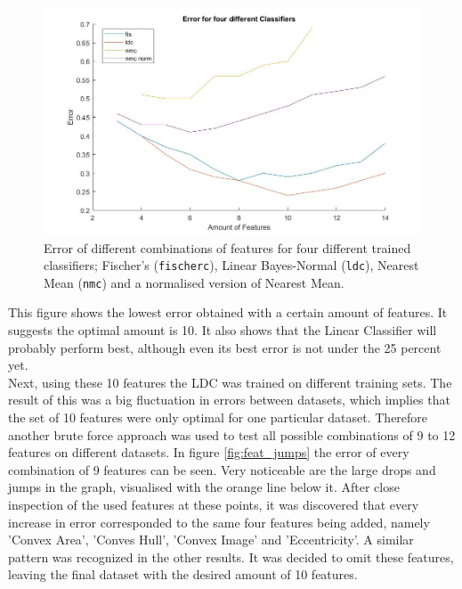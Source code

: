 \begin{figure}[H]
	\centering
	\includegraphics[scale=0.45]{images/feat_bf_error.jpg}
	\caption{Error of different combinations of features for four different trained classifiers; Fischer's (\texttt{fischerc}), Linear Bayes-Normal (\texttt{ldc}), Nearest Mean (\texttt{nmc}) and a normalised version of Nearest Mean.}
	\label{fig:feat_bf_error}
\end{figure}
\noindent This figure shows the lowest error obtained with a certain amount of features. It suggests the optimal amount is 10. It also shows that the Linear Classifier will probably perform best, although even its best error is not under the 25 percent yet. \\
Next, using these 10 features the LDC was trained on different training sets. The result of this was a big fluctuation in errors between datasets, which implies that the set of 10 features were only optimal for one particular dataset. Therefore another brute force approach was used to test all possible combinations of 9 to 12 features on different datasets. In figure \ref{fig:feat_jumps} the error of every combination of 9 features can be seen. Very noticeable are the large drops and jumps in the graph, visualised with the orange line below it. After close inspection of the used features at these points, it was discovered that every increase in error corresponded to the same four features being added, namely 'Convex Area', 'Conves Hull', 'Convex Image' and 'Eccentricity'. A similar pattern was recognized in the other results. It was decided to omit these features, leaving the final dataset with the desired amount of 10 features.
